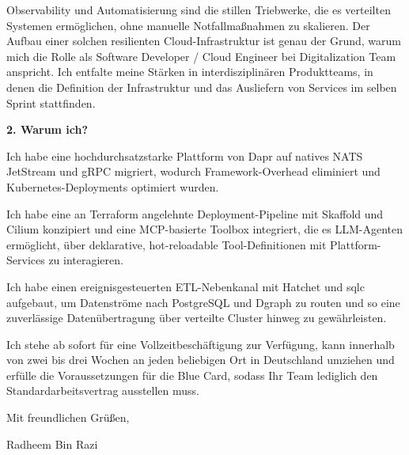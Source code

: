 \documentclass[11pt,a4paper]{coverletter}
\begin{document}
Observability und Automatisierung sind die stillen Triebwerke, die es verteilten Systemen ermöglichen, ohne manuelle Notfallmaßnahmen zu skalieren. Der Aufbau einer solchen resilienten Cloud-Infrastruktur ist genau der Grund, warum mich die Rolle als Software Developer / Cloud Engineer bei Digitalization Team anspricht. Ich entfalte meine Stärken in interdisziplinären Produktteams, in denen die Definition der Infrastruktur und das Ausliefern von Services im selben Sprint stattfinden.

\vspace{8pt}\noindent\textbf{2. Warum ich?}\par\vspace{3pt}

\bullets

  \item Ich habe eine hochdurchsatzstarke Plattform von Dapr auf natives NATS JetStream und gRPC migriert, wodurch Framework-Overhead eliminiert und Kubernetes-Deployments optimiert wurden.

  \item Ich habe eine an Terraform angelehnte Deployment-Pipeline mit Skaffold und Cilium konzipiert und eine MCP-basierte Toolbox integriert, die es LLM-Agenten ermöglicht, über deklarative, hot-reloadable Tool-Definitionen mit Plattform-Services zu interagieren.

  \item Ich habe einen ereignisgesteuerten ETL-Nebenkanal mit Hatchet und sqlc aufgebaut, um Datenströme nach PostgreSQL und Dgraph zu routen und so eine zuverlässige Datenübertragung über verteilte Cluster hinweg zu gewährleisten.

\bulletsend

Ich stehe ab sofort für eine Vollzeitbeschäftigung zur Verfügung, kann innerhalb von zwei bis drei Wochen an jeden beliebigen Ort in Deutschland umziehen und erfülle die Voraussetzungen für die Blue Card, sodass Ihr Team lediglich den Standardarbeitsvertrag ausstellen muss.

\closing{Mit freundlichen Grüßen,}{Radheem Bin Razi}
\end{document}
